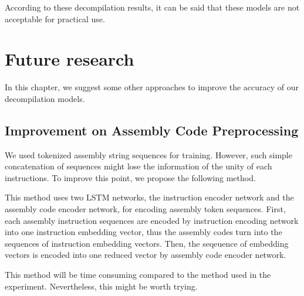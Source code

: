 \documentclass[senior,final,11pt]{iscs-thesis}
\begin{document}
According to these decompilation results, it can be said that these models are not acceptable for practical use.






\chapter{Future research}
In this chapter, we suggest some other approaches to improve the accuracy of our decompilation models.

\section{Improvement on Assembly Code Preprocessing}
We used tokenized assembly string sequences for training. 
However, such simple concatenation of sequences might lose the information of the unity of each instructions.
To improve this point, we propose the following method.

This method uses two LSTM networks, the instruction encoder network and the assembly code encoder network, for encoding assembly token sequences.
First, each assembly instruction sequences are encoded by instruction encoding network into one instruction embedding vector, 
thus the assembly codes turn into the sequences of instruction embedding vectors.
Then, the seqeuence of embedding vectors is encoded into one reduced vector by assembly code encoder network.

This method will be time consuming compared to the method used in the experiment.
Nevertheless, this might be worth trying.
\end{document}
